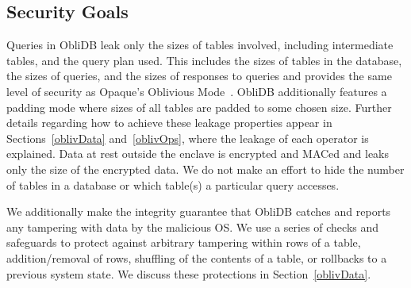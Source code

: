 \documentclass[letterpaper,twocolumn,10pt]{article}
\def\name/{ObliDB}
\begin{document}
\subsection{Security Goals}
Queries in \name/ leak only the sizes of tables involved, including intermediate tables, and the query plan used. This includes the sizes of tables in the database, the sizes of queries, and the sizes of responses to queries and provides the same level of security as Opaque's Oblivious Mode~\cite{ZDB+17}. \name/ additionally features a padding mode where sizes of all tables are padded to some chosen size. Further details regarding how to achieve these leakage properties appear in Sections~\ref{oblivData} and~\ref{oblivOps}, where the leakage of each operator is explained. Data at rest outside the enclave is encrypted and MACed and leaks only the size of the encrypted data. We do not make an effort to hide the number of tables in a database or which table(s) a particular query accesses.

We additionally make the integrity guarantee that \name/ catches and reports any tampering with data by the malicious OS. We use a series of checks and safeguards to protect against arbitrary tampering within rows of a table, addition/removal of rows, shuffling of the contents of a table, or rollbacks to a previous system state. We discuss these protections in Section~\ref{oblivData}.
\end{document}
